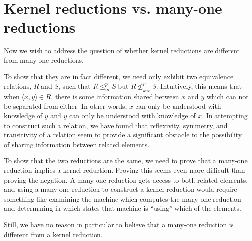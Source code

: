 \documentclass{article}
\theoremstyle{definition} \newtheorem{definition}[definition]{Definition}
\newcommand{\nkr}{\nleq^{p}_{ker}} %
\newcommand{\mor}{\leq^{p}_{m}} %
\newcommand{\pair}[2]{\langle#1,#2\rangle} %
\begin{document}

\section{Kernel reductions vs. many-one reductions}

Now we wish to address the question of whether kernel reductions are different
from many-one reductions.

To show that they are in fact different, we need only exhibit two equivalence
relations, $R$ and $S$, such that $R\mor S$ but $R\nkr S$. Intuitively, this
means that when $\pair{x}{y}\in R$, there is some information shared between
$x$ and $y$ which can not be separated from either. In other words, $x$ can
only be understood with knowledge of $y$ and $y$ can only be understood with
knowledge of $x$. In attempting to construct such a relation, we have found
that reflexivity, symmetry, and transitivity of a relation seem to provide a
significant obstacle to the possibility of sharing information between related
elements.

To show that the two reductions are the same, we need to prove that a many-one
reduction implies a kernel reduction. Proving this seems even more difficult
than proving the negation. A many-one reduction gets access to both related
elements, and using a many-one reduction to construct a kernel reduction would
require something like examining the machine which computes the many-one
reduction and determining in which states that machine is ``using'' which of
the elements.

Still, we have no reason in particular to believe that a many-one reduction is
different from a kernel reduction.

 
\end{document}
